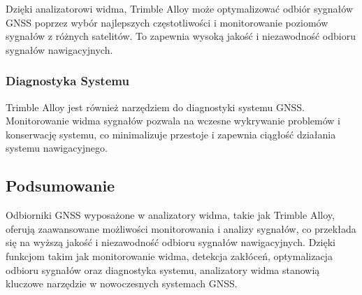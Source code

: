 Dzięki analizatorowi widma, Trimble Alloy może optymalizować odbiór sygnałów GNSS poprzez wybór najlepszych częstotliwości i monitorowanie poziomów sygnałów z różnych satelitów. To zapewnia wysoką jakość i niezawodność odbioru sygnałów nawigacyjnych.

\subsubsection{Diagnostyka Systemu}

Trimble Alloy jest również narzędziem do diagnostyki systemu GNSS. Monitorowanie widma sygnałów pozwala na wczesne wykrywanie problemów i konserwację systemu, co minimalizuje przestoje i zapewnia ciągłość działania systemu nawigacyjnego.

\subsection{Podsumowanie}

Odbiorniki GNSS wyposażone w analizatory widma, takie jak Trimble Alloy, oferują zaawansowane możliwości monitorowania i analizy sygnałów, co przekłada się na wyższą jakość i niezawodność odbioru sygnałów nawigacyjnych. Dzięki funkcjom takim jak monitorowanie widma, detekcja zakłóceń, optymalizacja odbioru sygnałów oraz diagnostyka systemu, analizatory widma stanowią kluczowe narzędzie w nowoczesnych systemach GNSS.
